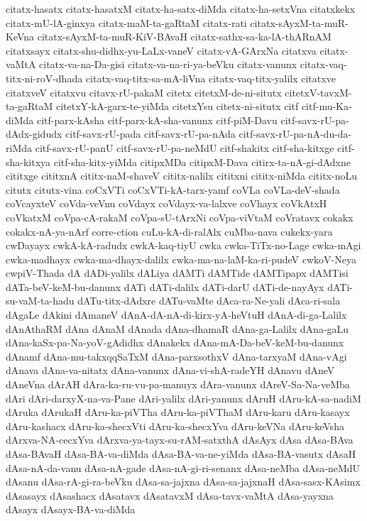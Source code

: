 {citatx-hasatx
citatx-hasatxM
citatx-ha-satx-diMda
citatx-ha-setxVna
citatxkekx
citatx-mU-lA-ginxya
citatx-maM-ta-gaRtaM
citatx-rati
citatx-sAyxM-ta-muR-KeVna
citatx-sAyxM-ta-muR-KiV-BAvaH
citatx-sathx-sa-ka-lA-thARnAM
citatxsayx
citatx-shu-didhx-yu-LaLx-vaneV
citatx-vA-GArxNa
citatxva
citatx-vaMtA
citatx-va-na-Da-gisi
citatx-va-na-ri-ya-beVku
citatx-vanunx
citatx-vaq-titx-ni-roV-dhada
citatx-vaq-titx-sa-mA-liVna
citatx-vaq-titx-yalilx
citatxve
citatxveV
citatxvu
citavx-rU-pakaM
citetx
citetxM-de-ni-situtx
citetxV-tavxM-ta-gaRtaM
citetxY-kA-garx-te-yiMda
citetxYsu
citetx-ni-situtx
citf
citf-mu-Ka-diMda
citf-parx-kAsha
citf-parx-kA-sha-vanunx
citf-piM-Davu
citf-savx-rU-pa-dAdx-gidudx
citf-savx-rU-pada
citf-savx-rU-pa-nAda
citf-savx-rU-pa-nA-du-da-riMda
citf-savx-rU-panU
citf-savx-rU-pa-neMdU
citf-shakitx
citf-sha-kitxge
citf-sha-kitxya
citf-sha-kitx-yiMda
citipxMDa
citipxM-Dava
citirx-ta-nA-gi-dAdxne
cititxge
cititxnA
cititx-naM-shaveV
cititx-nalilx
cititxni
cititx-niMda
cititx-noLu
citutx
citutx-vina
coCxVTi
coCxVTi-kA-tarx-yamf
coVLa
coVLa-deV-shada
coVcayxteV
coVda-veVnu
coVdayx
coVdayx-va-lalxve
coVhayx
coVkAtxH
coVkatxM
coVpa-cA-rakaM
coVpa-sU-tArxNi
coVpa-viVtaM
coVratavx
cokakx
cokakx-nA-ya-nArf
corre-ction
cuLu-kA-di-ralAlx
cuMba-nava
cukekx-yara
cwDayayx
cwkA-kA-radudx
cwkA-kaq-tiyU
cwka
cwka-TiTx-no-Lage
cwka-mAgi
cwka-madhayx
cwka-ma-dhayx-dalilx
cwka-ma-na-laM-ka-ri-pudeV
cwkoV-Neya
cwpiV-Thada
dA
dADi-yalilx
dALiya
dAMTi
dAMTide
dAMTipapx
dAMTisi
dATa-beV-keM-bu-danunx
dATi
dATi-dalilx
dATi-darU
dATi-de-nayAyx
dATi-su-vaM-ta-hadu
dATu-titx-dAdxre
dATu-vaMte
dAca-ra-Ne-yali
dAca-ri-sala
dAgaLe
dAkini
dAmaneV
dAnA-dA-nA-di-kirx-yA-heVtuH
dAnA-di-ga-Lalilx
dAnAthaRM
dAna
dAnaM
dAnada
dAna-dhamaR
dAna-ga-Lalilx
dAna-gaLu
dAna-kaSx-pa-Na-yoV-gAdidhx
dAnakekx
dAna-mA-Da-beV-keM-bu-danunx
dAnamf
dAna-mu-takxqqSaTxM
dAna-parxsothxV
dAna-tarxyaM
dAna-vAgi
dAnava
dAna-va-nitatx
dAna-vanunx
dAna-vi-shA-radeYH
dAnavu
dAneV
dAneVna
dArAH
dAra-ka-ru-vu-pa-manuyx
dAra-vanunx
dAreV-Sa-Na-veMba
dAri
dAri-darxyX-na-va-Pane
dAri-yalilx
dAri-yanunx
dAruH
dAru-kA-sa-nadiM
dAruka
dArukaH
dAru-ka-piVTha
dAru-ka-piVThaM
dAru-karu
dAru-kasayx
dAru-kashacx
dAru-ka-shecxVti
dAru-ka-shecxYva
dAru-keVNa
dAru-keVsha
dArxva-NA-cecxYva
dArxva-ya-tayx-su-rAM-satxthA
dAsAyx
dAsa
dAsa-BAva
dAsa-BAvaH
dAsa-BA-va-diMda
dAsa-BA-va-ne-yiMda
dAsa-BA-vasutx
dAsaH
dAsa-nA-da-vanu
dAsa-nA-gade
dAsa-nA-gi-ri-senanx
dAsa-neMba
dAsa-neMdU
dAsanu
dAsa-rA-gi-ra-beVku
dAsa-sa-jajxna
dAsa-sa-jajxnaH
dAsa-sasx-KAsimx
dAsasayx
dAsashacx
dAsatavx
dAsatavxM
dAsa-tavx-vaMtA
dAsa-yayxna
dAsayx
dAsayx-BA-va-diMda
}
